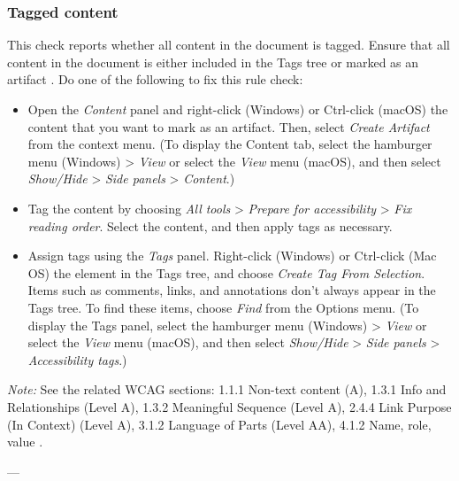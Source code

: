\subsubsection{Tagged content}
\label{subsubsec:acrobat-tagged-content}
This check reports whether all content in the document is tagged. Ensure that all content in the document is either included in the Tags tree or marked as an artifact \cite{AdobeHelpX}.
Do one of the following to fix this rule check:
\begin{itemize}
    \item Open the \emph{Content} panel and right-click (Windows) or Ctrl-click (macOS) the content that you want to mark as an artifact. Then, select \emph{Create Artifact} from the context menu. (To display the Content tab, select the hamburger menu (Windows) > \emph{View} or select the \emph{View} menu (macOS), and then select \emph{Show/Hide} > \emph{Side panels} > \emph{Content}.)
    \item Tag the content by choosing \emph{All tools} > \emph{Prepare for accessibility} > \emph{Fix reading order}. Select the content, and then apply tags as necessary.
    \item Assign tags using the \emph{Tags} panel. Right-click (Windows) or Ctrl-click (Mac OS) the element in the Tags tree, and choose \emph{Create Tag From Selection}. Items such as comments, links, and annotations don't always appear in the Tags tree. To find these items, choose \emph{Find} from the Options menu. (To display the Tags panel, select the hamburger menu (Windows) > \emph{View} or select the \emph{View} menu (macOS), and then select \emph{Show/Hide} > \emph{Side panels} > \emph{Accessibility tags}.)
\end{itemize}

\vspace{0.5em}
\noindent\textit{Note:} See the related WCAG sections: 1.1.1 Non-text content (A), 1.3.1 Info and Relationships (Level A), 1.3.2 Meaningful Sequence (Level A), 2.4.4 Link Purpose (In Context) (Level A), 3.1.2 Language of Parts (Level AA), 4.1.2 Name, role, value \cite{WCAG}.

---

